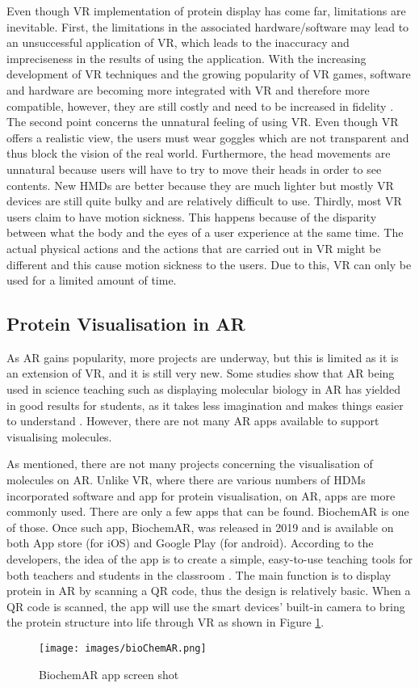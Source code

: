 Even though VR implementation of protein display has come far, limitations are inevitable.
First, the limitations in the associated hardware/software may lead to an unsuccessful application of VR, which leads to the inaccuracy and impreciseness in the results of using the application. With the increasing development of VR techniques and the growing popularity of VR games, software and hardware are becoming more integrated with VR and therefore more compatible, however, they are still costly and need to be increased in fidelity \parencite{liu_using_2018}.
The second point concerns the unnatural feeling of using VR. Even though VR offers a realistic view, the users must wear goggles which are not transparent and thus block the vision of the real world. Furthermore, the head movements are unnatural because users will have to try to move their heads in order to see contents. New HMDs are better because they are much lighter but mostly VR devices are still quite bulky and are relatively difficult to use. 
Thirdly, most VR users claim to have motion sickness. This happens because of the disparity between what the body and the eyes of a user experience at the same time. The actual physical actions and the actions that are carried out in VR might be different and this cause motion sickness to the users. Due to this, VR can only be used for a limited amount of time.


\subsection{Protein Visualisation in AR}

As AR gains popularity, more projects are underway, but this is limited as it is an extension of VR, and it is still very new. Some studies show that AR being used in science teaching such as displaying molecular biology in AR has yielded in good results for students, as it takes less imagination and makes things easier to understand \parencite{cai_case_2014}. However, there are not many AR apps available to support visualising molecules. 

As mentioned, there are not many projects concerning the visualisation of molecules on AR. Unlike VR, where there are various numbers of HDMs incorporated software and app for protein visualisation, on AR, apps are more commonly used. There are only a few apps that can be found. BiochemAR is one of those. Once such app, BiochemAR, was released in 2019 and is available on both App store (for iOS) and Google Play (for android). According to the developers, the idea of the app is to create a simple, easy-to-use teaching tools for both teachers and students in the classroom \parencite{sung_biochemar_2020}. The main function is to display protein in AR by scanning a QR code, thus the design is relatively basic. When a QR code is scanned, the app will use the smart devices’ built-in camera to bring the protein structure into life through VR as shown in Figure \ref{fig:bioChemAR}.
\begin{figure}[!htbp]
	\centering
	\texttt{[image: images/bioChemAR.png]}
	\caption{BiochemAR app screen shot}
	\label{fig:bioChemAR}
\end{figure}

